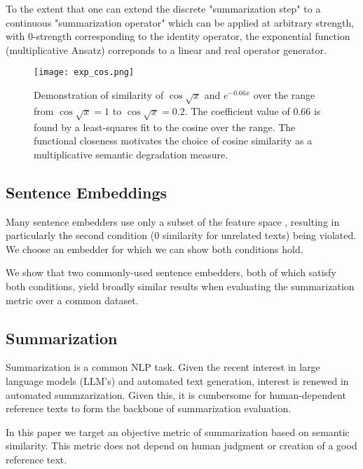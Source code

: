 \documentclass{article}
\newcommand\mycolor{\color{red}\xspace}
\begin{document}
To the extent that one can extend the discrete "summarization step" to a continuous "summarization operator" which can be applied at arbitrary strength, with 0-strength corresponding to the identity operator, the exponential function (multiplicative Ansatz) correponds to a linear and real operator generator.

\begin{figure}
	\centering
    \texttt{[image: exp\_cos.png]}
	\caption{Demonstration of similarity of $\cos \sqrt{x} $ and $e^{-0.66x}$ over the range from $\cos \sqrt{x}=1$ to $\cos \sqrt{x} = 0.2$.  The coefficient value of 0.66 is found by a least-squares fit to the cosine over the range.  The functional closeness motivates the choice of cosine similarity as a multiplicative semantic degradation measure.}
	\label{fig:expcos}
\end{figure}

\subsection{Sentence Embeddings}


Many sentence embedders use only a subset of the feature space \citet{badembeddings}, resulting in particularly the second condition (0 similarity for unrelated texts) being violated.
We choose an embedder for which we can show both conditions hold.

We show that two commonly-used sentence embedders, both of which satisfy both conditions, yield broadly similar results when evaluating the summarization metric over a common dataset.


\subsection{Summarization}

Summarization is a common NLP task. 
Given the recent interest in large language models (LLM's) and automated text generation, interest is renewed in automated summzarization.
Given this, it is cumbersome for human-dependent reference texts to form the backbone of summarization evaluation.

In this paper we target an objective metric of summarization based on semantic similarity.
This metric does not depend on human judgment or creation of a good reference text.
\end{document}
